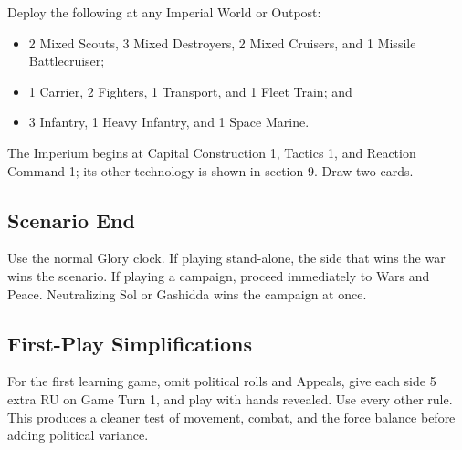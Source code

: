 Deploy the following at any Imperial World or Outpost:

\begin{itemize}
  \item 2 Mixed Scouts, 3 Mixed Destroyers, 2 Mixed Cruisers, and 1 Missile
    Battlecruiser;
  \item 1 Carrier, 2 Fighters, 1 Transport, and 1 Fleet Train; and
  \item 3 Infantry, 1 Heavy Infantry, and 1 Space Marine.
\end{itemize}

The Imperium begins at Capital Construction 1, Tactics 1, and Reaction Command
1; its other technology is shown in section 9. Draw two cards.

\subsection{Scenario End}

Use the normal Glory clock. If playing stand-alone, the side that wins the war
wins the scenario. If playing a campaign, proceed immediately to Wars and
Peace. Neutralizing Sol or Gashidda wins the campaign at once.

\subsection{First-Play Simplifications}

For the first learning game, omit political rolls and Appeals, give each side
5 extra RU on Game Turn 1, and play with hands revealed. Use every other rule.
This produces a cleaner test of movement, combat, and the force balance before
adding political variance.
